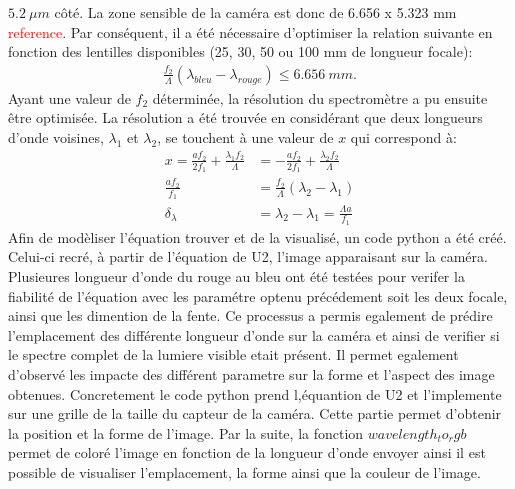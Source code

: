 \documentclass[conference]{IEEEtran}
\begin{document}
$5.2\ \mu m$ côté. La zone sensible de la caméra est donc de 6.656 x 5.323 mm \textcolor{red}{reference}. Par conséquent, il a été nécessaire d'optimiser la relation suivante
en fonction des lentilles disponibles (25, 30, 50 ou 100 mm de longueur focale):
\begin{align*}
    \frac{f_2}{\Lambda}(\lambda_{bleu}-\lambda_{rouge})\leq 6.656\ mm.
\end{align*}
Ayant une valeur de $f_2$ déterminée, la résolution du spectromètre a pu ensuite être optimisée. La résolution a été trouvée en
considérant que deux longueurs d'onde voisines, $\lambda_1$ et $\lambda_2$, se touchent à une valeur de $x$ qui correspond à:
\begin{align*}
    x=\frac{a f_2}{2f_1}+\frac{\lambda_1 f_2}{\Lambda}&=-\frac{a f_2}{2f_1}+\frac{\lambda_2 f_2}{\Lambda}\\
    \frac{af_2}{f_1}&=\frac{f_2}{\Lambda}(\lambda_2-\lambda_1)\\
    \delta_{\lambda}&=\lambda_2-\lambda_1=\frac{\Lambda a}{f_1}
\end{align*}
Afin de modèliser l'équation trouver et de la visualisé, un code python a été créé. Celui-ci recré, à partir de l'équation
de U2, l'image apparaisant sur la caméra. Plusieures longueur d'onde du rouge au bleu ont été testées pour verifer 
la fiabilité de l'équation avec les paramétre optenu précédement soit les deux focale, ainsi que les dimention de la fente. 
Ce processus a permis egalement de prédire l'emplacement des différente longueur d'onde sur la caméra 
et ainsi de verifier si le spectre complet de la lumiere visible etait présent. Il permet egalement d'observé les
impacte des différent parametre sur la forme et l'aspect des image obtenues. Concretement le code python prend 
l,équantion de U2 et l'implemente sur une grille de la taille du capteur de la caméra. Cette partie permet d'obtenir 
la position et la forme de l'image. Par la suite, la fonction $wavelength_to_rgb$ permet de coloré l'image en fonction
de la longueur d'onde envoyer ainsi il est possible de visualiser l'emplacement, la forme ainsi que la couleur de l'image.    
\end{document}
